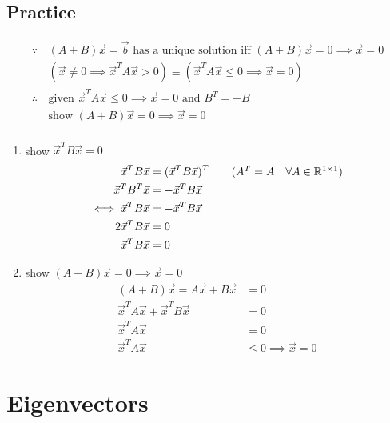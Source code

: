 	\subsection{Practice}
		\begin{example}[let $A\in\mathbb{R}^{n\times n}$ st $\vec x\ne0\implies\vec x^TA\vec x>0$\\
			Show $\forall $skew-symmetric $B\in\mathbb{R}^{n\times n},\vec b\in\mathbb{R}^n$
			$$(A+B)\vec x=\vec b$$ as a unique solution]
			\begin{align*}
				\because\,&(A+B)\vec x=\vec b\text{ has a unique solution iff }(A+B)\vec x=0\implies\vec x=0\\
				&(\vec x\ne0\implies\vec x^TA\vec x>0)\equiv(\vec x^TA\vec x\le0\implies\vec x=0)\\
				\therefore\,&\text{given }\vec x^TA\vec x\le0\implies\vec x=0\text{ and }B^T=-B\\
				&\text{show }(A+B)\vec x=0\implies\vec x=0\\
			\end{align*}
			\begin{enumerate}
				\item show $\vec x^TB\vec x=0$
				\begin{align*}
					\vec x^TB\vec x&=(\vec x^TB\vec x)^T\tag*{($A^T=A\quad\forall A\in\mathbb{R}^{1\times1}$)}\\
					\vec x^TB^T\vec x&=-\vec x^TB\vec x\\
					\iff\vec x^TB\vec x&=-\vec x^TB\vec x\\
					2\vec x^TB\vec x&=0\\
					\vec x^TB\vec x&=0\\
				\end{align*}
				\item show $(A+B)\vec x=0\implies\vec x=0$
				\begin{align*}
					(A+B)\vec x=A\vec x+B\vec x&=0\tag*{(distributivity)}\\
					\vec x^TA\vec x+\vec x^TB\vec x&=0\tag*{(left mul by $\vec x^T$)}\\
					\vec x^TA\vec x&=0\tag*{(from 1)}\\
					\vec x^TA\vec x&\le0\implies\vec x=0\tag*{(given)}
				\end{align*}
			\end{enumerate}
		\end{example}
\section{Eigenvectors}
